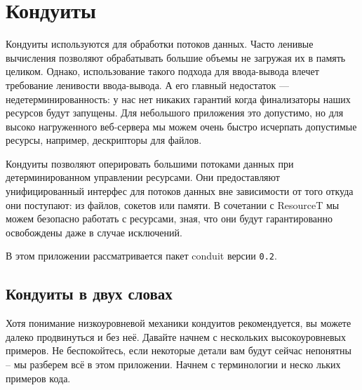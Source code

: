 \chapter{Кондуиты}

Кондуиты используются для обработки потоков данных. Часто ленивые вычисления
позволяют обрабатывать большие объемы не загружая их в память целиком. Однако, 
использование такого подхода для ввода-вывода влечет требование ленивости ввода-вывода.
А его главный недостаток --- недетерминированность: у нас нет никаких гарантий когда
финализаторы наших ресурсов будут запущены. Для небольшого приложения это допустимо, но
для высоко нагруженного веб-сервера мы можем очень быстро исчерпать допустимые ресурсы,
например, дескрипторы для файлов.

Кондуиты позволяют оперировать большими потоками данных при детерминированном управлении
ресурсами. Они предоставляют унифицированный интерфес для потоков данных вне зависимости
от того откуда они поступают: из файлов, сокетов или памяти. В сочетании с ResourceT мы
можем безопасно работать с ресурсами, зная, что они будут гарантированно освобождены даже
в случае исключений.

В этом приложении рассматривается пакет conduit версии \verb=0.2=.


\section{Кондуиты в двух словах}

Хотя понимание низкоуровневой механики кондуитов рекомендуется, вы можете далеко
продвинуться и без неё. Давайте начнем  с нескольких  высокоуровневых 	 примеров.  Не
беспокойтесь, если некоторые детали      вам   будут       сейчас	  непонятны -- 
  мы разберем всё  в этом   приложении. Начнем с терминологии    и	  неско
льких	   примеров    кода.

